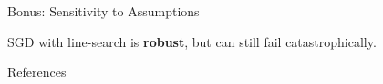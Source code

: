 \documentclass[notheorems]{beamer}
\begin{document}
    \begin{frame}{Bonus: Sensitivity to Assumptions}

        SGD with line-search is \textbf{robust}, but can still fail catastrophically.

        \begin{figure}
        \end{figure}

    \end{frame}

    \begin{frame}[allowframebreaks]{References}
        
        
    \end{frame}
\end{document}
